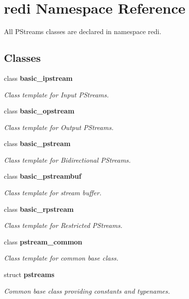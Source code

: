 \hypertarget{namespaceredi}{}\section{redi Namespace Reference}
\label{namespaceredi}


All P\+Streams classes are declared in namespace redi.  


\subsection*{Classes}
\begin{DoxyCompactItemize}
\item 
class {\bfseries basic\+\_\+ipstream}
\begin{DoxyCompactList}\small\item\em Class template for Input P\+Streams. \end{DoxyCompactList}\item 
class {\bfseries basic\+\_\+opstream}
\begin{DoxyCompactList}\small\item\em Class template for Output P\+Streams. \end{DoxyCompactList}\item 
class {\bfseries basic\+\_\+pstream}
\begin{DoxyCompactList}\small\item\em Class template for Bidirectional P\+Streams. \end{DoxyCompactList}\item 
class {\bfseries basic\+\_\+pstreambuf}
\begin{DoxyCompactList}\small\item\em Class template for stream buffer. \end{DoxyCompactList}\item 
class {\bfseries basic\+\_\+rpstream}
\begin{DoxyCompactList}\small\item\em Class template for Restricted P\+Streams. \end{DoxyCompactList}\item 
class {\bfseries pstream\+\_\+common}
\begin{DoxyCompactList}\small\item\em Class template for common base class. \end{DoxyCompactList}\item 
struct {\bfseries pstreams}
\begin{DoxyCompactList}\small\item\em Common base class providing constants and typenames. \end{DoxyCompactList}\end{DoxyCompactItemize}

